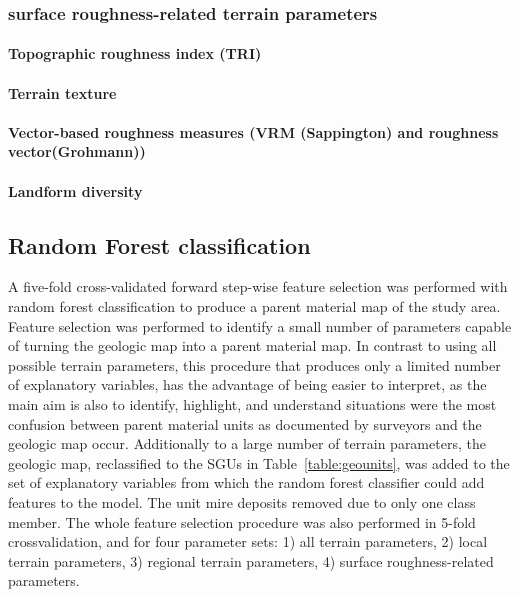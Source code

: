\documentclass[preprint,12pt,authoryear]{elsarticle}
\begin{document}
\subsubsection{surface roughness-related terrain parameters}
\paragraph{Topographic roughness index (TRI)}  \citep{Riley1999}
\paragraph{Terrain texture}
\paragraph{Vector-based roughness measures (VRM (Sappington) and roughness vector(Grohmann))}
\paragraph{Landform diversity} 

\subsection{Random Forest classification }
A five-fold cross-validated forward step-wise feature selection was performed with random forest classification to produce a parent material map of the study area. Feature selection was performed to identify a small number of parameters capable of turning the geologic map into a parent material map. In contrast to using all possible terrain parameters, this procedure that produces only a limited number of explanatory variables, has the advantage of being easier to interpret, as the main aim is also to identify, highlight, and understand situations were the most confusion between parent material units as documented by surveyors and the geologic map occur. Additionally to a large number of terrain parameters, the geologic map, reclassified to the SGUs in Table~\ref{table:geounits}, was added to the set of explanatory variables from which the random forest classifier could add features to the model. The unit mire deposits removed due to only one class member. The whole feature selection procedure was also performed in 5-fold crossvalidation, and for four parameter sets: 1) all terrain parameters, 2) local terrain parameters, 3) regional terrain parameters, 4) surface roughness-related parameters.
\end{document}

